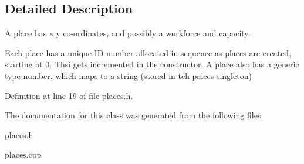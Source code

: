 \subsection{Detailed Description}
A place has x,y co-\/ordinates, and possibly a workforce and capacity. 

Each place has a unique ID number allocated in sequence as places are created, starting at 0. Thsi gets incremented in the constructor. A place also has a generic type number, which maps to a string (stored in teh palces singleton) 

Definition at line 19 of file places.\+h.



The documentation for this class was generated from the following files\+:\begin{DoxyCompactItemize}
\item 
places.\+h\item 
places.\+cpp\end{DoxyCompactItemize}
